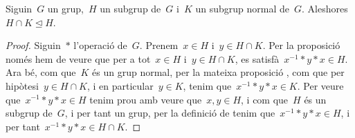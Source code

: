 \documentclass[../../main.tex]{subfiles}
\begin{document}
    \begin{lemma}
        \label{lema:Segon Teorema de l'isomorfisme entre grups}
        Siguin~\(G\) un grup,~\(H\) un subgrup de~\(G\) i~\(K\) un subgrup normal de~\(G\).
        Aleshores~\(H\cap K\trianglelefteq H\).
        \begin{proof}
            Siguin~\(\ast\) l'operació de~\(G\).
            Prenem~\(x\in H\) i~\(y\in H\cap K\).
            Per la proposició  només hem de veure que per a tot~\(x\in H\) i~\(y\in H\cap K\), es satisfà~\(x^{-1}\ast y\ast x\in H\).
            Ara bé, com que~\(K\) és un grup normal, per la mateixa proposició , com que per hipòtesi~\(y\in H\cap K\), i en particular~\(y\in K\), tenim que~\(x^{-1}\ast y\ast x\in K\).
            Per veure que~\(x^{-1}\ast y\ast x\in H\) tenim prou amb veure que~\(x,y\in H\), i com que~\(H\) és un subgrup de~\(G\), i per tant un grup, per la definició de  tenim que~\(x^{-1}\ast y\ast x\in H\), i per tant~\(x^{-1}\ast y\ast x\in H\cap K\).
        \end{proof}
    \end{lemma}
\end{document}
